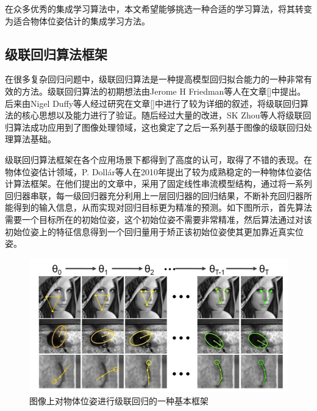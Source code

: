 在众多优秀的集成学习算法中，本文希望能够挑选一种合适的学习算法，将其转变为适合物体位姿估计的集成学习方法。

\subsection{级联回归算法框架} %

在很多复杂回归问题中，级联回归算法是一种提高模型回归拟合能力的一种非常有效的方法。级联回归算法的初期想法由Jerome H Friedman等人在文章[]中提出。后来由Nigel Duffy等人经过研究在文章[]中进行了较为详细的叙述，将级联回归算法的核心思想以及能力进行了验证。随后经过大量的改进，SK Zhou等人将级联回归算法成功应用到了图像处理领域，这也奠定了之后一系列基于图像的级联回归处理算法基础\cite{zhou2005image}。

级联回归算法框架在各个应用场景下都得到了高度的认可，取得了不错的表现。在物体位姿估计领域，P. Doll{\'a}r等人在2010年提出了较为成熟稳定的一种物体位姿估计算法框架\cite{dollar2010cascaded}。在他们提出的文章中，采用了固定线性串流模型结构，通过将一系列回归器串联，每一级回归器充分利用上一层回归器的回归结果，不断补充回归器所能得到的输入信息，从而实现对回归目标更为精准的预测。如下图所示，首先算法需要一个目标所在的初始位姿，这个初始位姿不需要非常精准，然后算法通过对该初始位姿上的特征信息得到一个回归量用于矫正该初始位姿使其更加靠近真实位姿。
\begin{figure}[htb]
	\centering 
	\includegraphics[width=\textwidth]{./mypic/级联回归.jpg} 
	\caption{图像上对物体位姿进行级联回归的一种基本框架} 
\end{figure}

